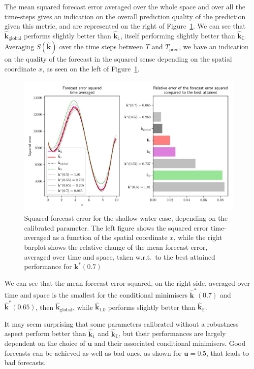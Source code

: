 \documentclass[preprint, 1p]{elsarticle}
\newcommand{\Ex}{\mathbb{E}}
\newcommand{\hatkmean}{\hat{\mathbf{k}}_{\Ex}}
\newcommand{\kest}{\hat{\mathbf{k}}}
\newlength{\onehalfcolumn}
\begin{document}
The mean squared forecast error averaged over the whole space and over all the time-steps gives an indication on the overall prediction quality of the prediction given this metric, and are represented on the right of Figure~\ref{fig:forecast_squared_error}. We can see that $\kest_{\mathrm{global}}$ performs slightly better than $\kest_1$, itself performing slightly better than $\hatkmean$.
Averaging $S(\mathbf{\kest})$ over the time steps between $T$ and $T_{\mathrm{pred}}$, we have an indication on the quality of the forecast in the squared sense depending on the spatial coordinate $x$, as seen on the left of Figure~\ref{fig:forecast_squared_error}.

\begin{figure}[!h]
\centering
\includegraphics[width=\onehalfcolumn]{Figures/FIG13.pdf}
\caption{Squared forecast error for the shallow water case, depending on the calibrated parameter. The left figure shows the squared error time-averaged as a function of the spatial coordinate $x$, while the right barplot shows the relative change of the mean forecast error, averaged over time and space, taken w.r.t.\ to the best attained performance for $\mathbf{k}^*(0.7)$}
\label{fig:forecast_squared_error}
\end{figure}

We can see that the mean forecast error squared, on the right side, averaged over time and space is the smallest for the conditional minimisers $\kest^*(0.7)$ and $\kest^*(0.65)$, then $\kest_{\mathrm{global}}$, while $\kest_{1.0}$ performs slightly better than $\hatkmean$.


It may seem surprising that some parameters calibrated without a robustness aspect perform better than $\kest_1$ and $\hatkmean$, but their performances are largely dependent on the choice of $\mathbf{u}$ and their associated conditional minimisers. Good forecasts can be achieved as well as bad ones, as shown for $\mathbf{u}=0.5$, that leads to bad forecasts.
\end{document}
